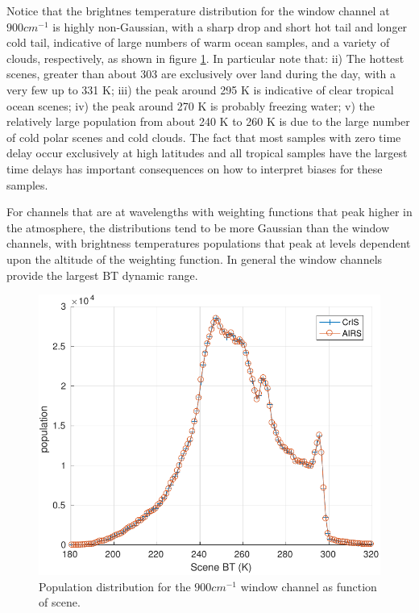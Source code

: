 \documentclass[11pt]{article}
\begin{document}
Notice that the brightnes temperature distribution for the window channel at $900 cm^{-1}$ is highly non-Gaussian, with a sharp drop and short hot tail and longer cold tail, indicative of large numbers of warm ocean samples, and a variety of clouds, respectively, as shown in figure \ref{fig:Y2}. In particular note that: 
ii) The hottest scenes, greater than about 303 are exclusively over land during the day, with a very few up to 331 K; 
iii) the peak around 295 K is indicative of clear tropical ocean scenes; 
iv) the peak around 270 K is probably freezing water; 
v) the relatively large population from about 240 K to 260 K is due to the large number of cold polar scenes and cold clouds. The fact that most samples with zero time delay occur exclusively at high latitudes and all tropical samples have the largest time delays has important consequences on how to interpret biases for these samples.

For channels that are at wavelengths with weighting functions that peak higher in the atmosphere, the distributions tend to be more Gaussian than the window channels, with brightness temperatures populations that peak at levels dependent upon the altitude of the weighting function. In general the window channels provide the largest BT dynamic range.

\begin{figure}[htb]
\centering
\includegraphics[width=.6\linewidth]{./figs/AC_jplSNO_900wn_population_vs_scene.pdf}
\caption{\label{fig:orgparagraph11}
  Population distribution for the $900 cm^{-1}$ window channel as function of scene.}
\label{fig:Y2}
\end{figure}

\end{document}
